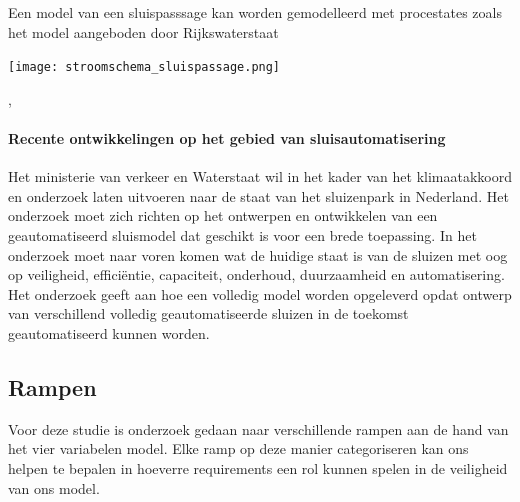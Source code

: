 \documentclass{article}
\begin{document}
	\cite{woudagemaalSluizen}
	\cite{bardetsluizenAmsterdam}
	\cite{historischesluizen}
	Een model van een sluispasssage kan worden gemodelleerd met procestates zoals het model aangeboden door Rijkswaterstaat
	\begin{center}
		
		\texttt{[image: stroomschema\_sluispassage.png]} %
		
	\end{center}
	
	
	
	
	\cite[p.79~--113]{rijksoverheidSluizen}
	\cite[p.159]{rijksoverheidSluisStroomschema},
	
	
	
	
	\paragraph{Recente ontwikkelingen op het gebied van sluisautomatisering}
	
	Het ministerie van verkeer en Waterstaat wil in het kader van het klimaatakkoord en onderzoek laten uitvoeren naar de staat van het sluizenpark in Nederland. Het onderzoek moet zich richten op het ontwerpen en ontwikkelen van een geautomatiseerd sluismodel dat geschikt is voor een brede toepassing. In het onderzoek moet naar voren komen wat de huidige staat is van de sluizen met oog op veiligheid, efficiëntie, capaciteit, onderhoud, duurzaamheid en automatisering. Het onderzoek geeft aan hoe een volledig model worden opgeleverd opdat ontwerp van verschillend volledig geautomatiseerde sluizen in de toekomst geautomatiseerd kunnen worden.  
	
	
	\subsection{Rampen}
	
	\newline \indent Voor deze studie is onderzoek gedaan naar verschillende rampen aan de hand van het vier variabelen model.
	Elke ramp op deze manier categoriseren  kan ons helpen te bepalen in hoeverre requirements een rol kunnen spelen in de veiligheid van ons model.
	
\end{document}

